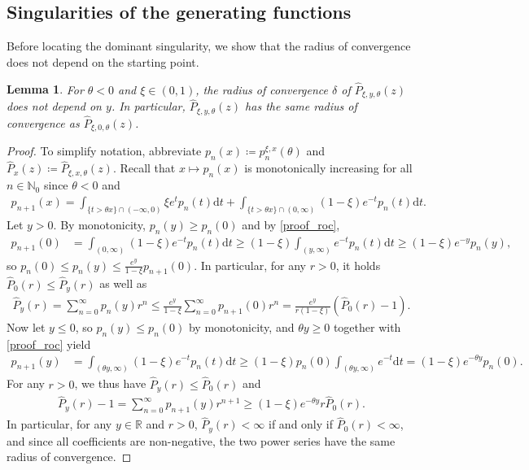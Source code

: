 \documentclass[12pt]{article}
\newcommand{\N}{\mathbb{N}} %
\newcommand{\R}{\mathbb{R}} %
\newcommand{\1}{\mathds{1}}
\renewcommand{\d}{\mathrm{d}}
\theoremstyle{definition}
\theoremstyle{plain}
\newtheorem{Lemma}[definition]{Lemma}
\theoremstyle{remark}
\begin{document}
\subsection{Singularities of the generating functions}
Before locating the dominant singularity, we show that the radius of convergence does not depend on the starting point.
\begin{Lemma}\label{roc_P_not_depending_on_y}
     For $\theta<0$ and $\xi\in(0,1)$, the radius of convergence $\delta$ of $\hat{P}_{\xi,y,\theta}(z)$ does not depend on $y$. In particular, $\hat{P}_{\xi,y,\theta}(z)$ has the same radius of convergence as $\hat{P}_{\xi,0,\theta}(z)$.
\end{Lemma}
\begin{proof}
    To simplify notation, abbreviate $p_n(x)\coloneqq p_n^{\xi,x}(\theta)$ and $\hat{P}_x(z)\coloneqq \hat{P}_{\xi,x,\theta}(z)$. Recall that $x\mapsto p_n(x)$ is monotonically increasing for all $n\in\N_0$ since $\theta<0$ and 
    \begin{align}\label{proof_roc}
        p_{n+1}(x)=\int_{\{t>\theta x\}\cap(-\infty,0)}\xi  e^tp_n(t)\d t+\int_{\{t>\theta x\}\cap(0,\infty)}(1-\xi)  e^{-t}p_n(t)\d t.
    \end{align}
Let $y>0$. By monotonicity, $p_n(y)\geq p_n(0)$ and by \eqref{proof_roc},
\begin{align*}
   p_{n+1}(0)&= \int_{(0,\infty)}(1-\xi)  e^{-t}p_n(t)\d t
   \ge (1-\xi)\int_{(y,\infty)}  e^{-t}p_n(t)\d t
   \ge (1-\xi)e^{-y}p_n(y),
\end{align*}
so $p_n(0)\le p_n(y)\le\frac{e^y}{1-\xi}p_{n+1}(0)$. In particular, for any $r>0$, it holds $\hat{P}_0(r)\le\hat P_y(r)$ as well as
\begin{align*}
    \hat P_y(r)=\sum_{n=0}^\infty p_n(y)r^n\le \frac{e^y}{1-\xi}\sum_{n=0}^\infty p_{n+1}(0)r^n=\frac{e^y}{r(1-\xi)}(\hat P_0(r)-1).
\end{align*}
Now let $y\le 0$, so $p_n(y)\le p_n(0)$ by monotonicity, and $\theta y\ge 0$ together with \eqref{proof_roc} yield
\begin{align*}
    p_{n+1}(y)&= \int_{(\theta y,\infty)}(1-\xi)  e^{-t}p_n(t)\d t
   \ge (1-\xi)p_n(0)\int_{(\theta y,\infty)}  e^{-t}\d t
   =(1-\xi)e^{-\theta y}p_n(0).
\end{align*}
For any $r>0$, we thus have $\hat P_y(r)\le \hat P_0(r)$ and 
\begin{align*}
     \hat P_y(r)-1=\sum_{n=0}^\infty p_{n+1}(y)r^{n+1}\ge (1-\xi)e^{-\theta y} r \hat P_0(r).
\end{align*}
In particular, for any $y\in\R$ and $r>0$, $\hat P_y(r)<\infty$ if and only if $\hat P_0(r)<\infty$, and since all coefficients are non-negative, the two power series have the same radius of convergence.
\end{proof} 
\end{document}
